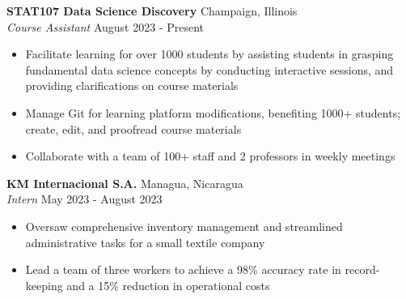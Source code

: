 \documentclass[a4paper]{article}
\begin{document}
    \vspace{1mm}

\textbf{STAT107 Data Science Discovery} 
\hfill Champaign, Illinois\\
\textit{Course Assistant} \hfill August 2023 - Present\\
    \begin{itemize}[noitemsep]
    \item Facilitate learning for over 1000 students by assisting 
    students in grasping fundamental
    data science concepts by conducting interactive sessions,
    and providing clarifications on course materials
    \item Manage Git for learning platform modifications, 
    benefiting 1000+ students; create, edit, and proofread course materials
    \item Collaborate with a team of 100+ staff and 2 professors in weekly meetings 
    \end{itemize}

    \vspace{1mm}

\textbf{KM Internacional S.A.} \hfill Managua, Nicaragua\\
\textit{Intern} \hfill May 2023 - August 2023\\
    \begin{itemize}[noitemsep]
	\item  Oversaw comprehensive inventory management and streamlined
     administrative tasks for a small textile company
    \item Lead a team of three workers to achieve a 98\% 
    accuracy rate in record-keeping 
    and a 15\% reduction in operational costs
\end{itemize}
\vspace{1mm}
\end{document}
